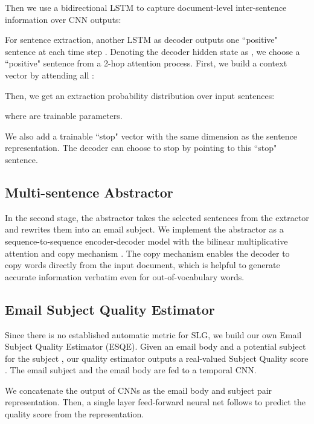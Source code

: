 \documentclass[11pt,a4paper]{article}
\newcommand{\esqe}{{\sc ESQE}\xspace}
\begin{document}
Then we use a bidirectional LSTM \cite{hochreiter1997long} to capture document-level inter-sentence information over CNN outputs:


For sentence extraction, another LSTM as decoder outputs one ``positive" sentence at each time step .
Denoting the decoder hidden state as , we choose a ``positive" sentence from a 2-hop attention process.
First, we build a context vector  by attending all :

Then, we get an extraction probability distribution  over input sentences:

where  are trainable parameters.

We also add a trainable ``stop" vector with the same dimension as the sentence representation.
The decoder can choose to stop by pointing to this ``stop" sentence.

\vspace{-1mm}
\subsection{Multi-sentence Abstractor}
\vspace{-1mm}
\label{sec:abstractor}
In the second stage, the abstractor takes the selected sentences from the extractor and rewrites them into an email subject.
We implement the abstractor as a sequence-to-sequence encoder-decoder model with the bilinear multiplicative attention \cite{luong2015effective} and copy mechanism \cite{see2017get}.
The copy mechanism enables the decoder to copy words directly from the input document, which is helpful to generate accurate information verbatim even for out-of-vocabulary words.

\vspace{-1mm}
\subsection{Email Subject Quality Estimator}
\vspace{-1mm}
\label{sec:esqe}
Since there is no established automatic metric for SLG, we build our own Email Subject Quality Estimator (\esqe).
Given an email body  and a potential subject for the subject , our quality estimator outputs a real-valued Subject Quality score .
The email subject and the email body are fed to a temporal CNN.

We concatenate the output of CNNs as the email body and subject pair representation.
Then, a single layer feed-forward neural net follows to predict the quality score from the representation.
\end{document}

